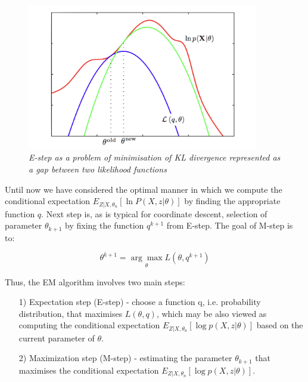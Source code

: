 \begin{figure}[ht]

\begin{center}
	\includegraphics[width=0.9\textwidth]{Loglike.png}
\end{center}

\caption{\textit{E-step as a problem of minimisation of KL divergence represented as a gap between two likelihood functions}}

\end{figure}

Until now we have considered the optimal manner in which we compute the conditional expectation $E_{Z|X,\theta_n} [\ln P(X,z|\theta)]$ by finding the appropriate function $q$. Next step is, as is typical for coordinate descent, selection of parameter $\theta_{k+1}$ by fixing the function $q^{k+1}$ from E-step. The goal of M-step is to:

\begin{equation}
\theta^{k+1} = \underset{\theta}{\arg\max} L(\theta, q^{k+1})
\end{equation}

Thus, the EM algorithm involves two main steps:

\begin{itemize}
\item[1)] Expectation step (E-step) - choose a function q, i.e. probability distribution, that maximises $L(\theta, q)$, which may be also viewed as computing the conditional expectation $E_{Z|X,\theta_n} [\log p(X,z|\theta)]$ based on the current parameter of $\theta$.
\item[2)] Maximization step (M-step) - estimating the parameter $\theta_{k+1}$ that maximises the conditional expectation $E_{Z|X,\theta_n} [\log p(X,z|\theta)]$.
\end{itemize}

